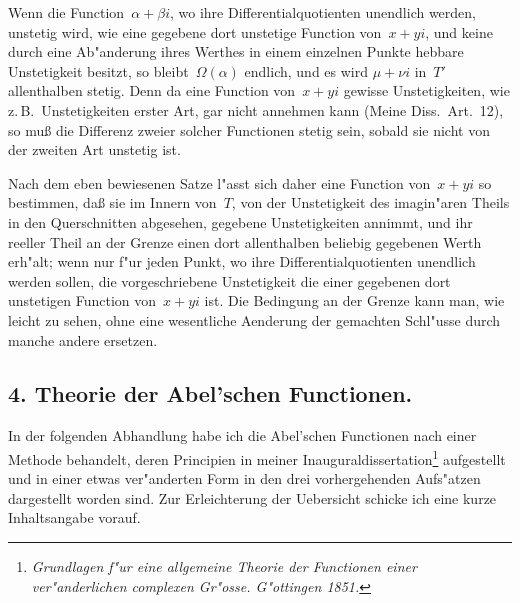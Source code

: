 \documentclass[12pt,a4paper]{book}
\theoremstyle{definition}
\theoremstyle{remark}
\begin{document}
Wenn die Function~$\alpha + \beta i$, wo ihre Differentialquotienten unendlich
werden, unstetig wird, wie eine gegebene dort unstetige Function von~$x + yi$,
und keine durch eine Ab"anderung ihres Werthes in einem einzelnen Punkte
hebbare Unstetigkeit besitzt, so bleibt~$\Omega(\alpha)$ endlich, und es wird
$\mu + \nu i$ in~$T'$ allenthalben stetig. Denn da eine Function von~$x + yi$
gewisse Unstetigkeiten, wie z.\,B.\ Unstetigkeiten erster Art, gar nicht
annehmen kann (Meine Diss.\ Art.~12), so mu\ss{} die Differenz zweier solcher
Functionen stetig sein, sobald sie nicht von der zweiten Art unstetig ist.

Nach dem eben bewiesenen Satze l"asst sich daher eine Function von~$x + yi$
so bestimmen, da\ss{} sie im Innern von~$T$, von der Unstetigkeit des
imagin"aren Theils in den Querschnitten abgesehen, gegebene Unstetigkeiten
annimmt, und ihr reeller Theil an der Grenze einen dort allenthalben
beliebig gegebenen Werth erh"alt; wenn nur f"ur jeden Punkt, wo ihre
Differentialquotienten unendlich werden sollen, die vorgeschriebene
Unstetigkeit die einer gegebenen dort unstetigen Function von~$x + yi$ ist.
Die Bedingung an der Grenze kann man, wie leicht zu sehen, ohne eine
wesentliche Aenderung der gemachten Schl"usse durch manche andere ersetzen.

\newpage
\subsection*{4. Theorie der Abel'schen Functionen.}

In der folgenden Abhandlung habe ich die Abel'schen Functionen nach
einer Methode behandelt, deren Principien in meiner Inauguraldissertation\footnote{\textit{Grundlagen f"ur eine allgemeine Theorie der Functionen einer
ver"anderlichen complexen Gr"osse. G"ottingen 1851.}} aufgestellt und in einer
etwas ver"anderten Form in den drei vorhergehenden Aufs"atzen dargestellt
worden sind. Zur Erleichterung der Uebersicht schicke ich eine kurze
Inhaltsangabe vorauf.
\end{document}
